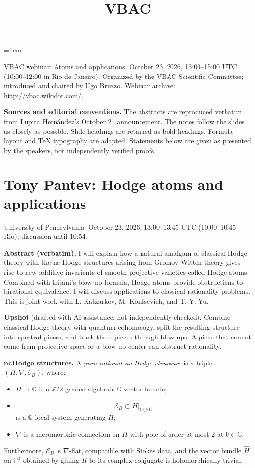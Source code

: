 

\emergencystretch=1em
\title{VBAC}
\maketitle
\tableofcontents

VBAC webinar: Atoms and applications.
October 23, 2026, 13:00--15:00 UTC
(10:00--12:00 in Rio de Janeiro).
Organized by the VBAC Scientific Committee;
introduced and chaired by Ugo Bruzzo.
Webinar archive:
\url{http://vbac.wikidot.com/}.

\medskip\noindent
\textbf{Sources and editorial conventions.}
The abstracts are reproduced verbatim from
Lupita Hern\'andez's October 21 announcement.
The notes follow the slides
as closely as possible.
Slide headings are retained as bold headings.
Formula layout and TeX typography are
adapted.
Statements below are given as presented
by the speakers, not independently verified
proofs.

\section{Tony Pantev: Hodge atoms
and applications}
\label{section-vbac-pantev}
University of Pennsylvania.
October 23, 2026, 13:00--13:45 UTC
(10:00--10:45 Rio); discussion until 10:54.

\medskip\noindent
\textbf{Abstract (verbatim).}
I will explain how a natural amalgam of
classical Hodge theory with the nc Hodge
structures arising from Gromov-Witten theory
gives rise to new additive invariants of
smooth projective varieties called Hodge
atoms. Combined with Iritani's blow-up
formula, Hodge atoms provide obstructions
to birational equivalence. I will discuss
applications to classical rationality
problems. This is joint work with
L. Katzarkov, M. Kontsevich, and T. Y. Yu.

\medskip\noindent
\textbf{Upshot} (drafted with AI assistance;
not independently checked)\textbf{.}
Combine classical Hodge theory with quantum
cohomology, split the resulting structure
into spectral pieces, and track those pieces
through blow-ups. A piece that cannot come
from projective space or a blow-up center
can obstruct rationality.

\medskip\noindent
\textbf{ncHodge structures.}
A \emph{pure rational nc-Hodge structure}
is a triple $(H,\nabla,\mathcal E_B)$, where:
\begin{itemize}
\item $H\longrightarrow\mathbb C$ is a
$\mathbb Z/2$-graded algebraic
$\mathbb C$-vector bundle;
\item
$$
\mathcal E_B\subset
H|_{\mathbb C\setminus\{0\}}
$$
is a $\mathbb Q$-local system generating $H$;
\item $\nabla$ is a meromorphic connection
on $H$ with pole of order at most $2$ at
$0\in\mathbb C$.
\end{itemize}
Furthermore, $\mathcal E_B$ is
$\nabla$-flat, compatible with Stokes data,
and the vector bundle $\widehat H$ on
$\mathbb P^1$ obtained by gluing $H$ to its
complex conjugate is holomorphically trivial.

